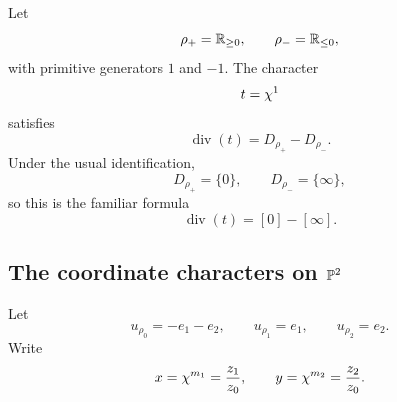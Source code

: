 \begin{example}
Let
\[
\rho_+=\mathbb{R}_{\geq0},
\qquad
\rho_-=\mathbb{R}_{\leq0},
\]
with primitive generators \(1\) and \(-1\). The character
\[
t=\chi^{1}
\]
satisfies
\[
\operatorname{div}(t)
=
D_{\rho_+}-D_{\rho_-}.
\]
Under the usual identification,
\[
D_{\rho_+}=\{0\},
\qquad
D_{\rho_-}=\{\infty\},
\]
so this is the familiar formula
\[
\operatorname{div}(t)
=
[0]-[\infty].
\]
\end{example}

\subsection{The coordinate characters on \texorpdfstring{\(\mathbb{P}^2\)}{P2}}

Let
\[
u_{\rho_0}=-e_1-e_2,
\qquad
u_{\rho_1}=e_1,
\qquad
u_{\rho_2}=e_2.
\]
Write
\[
x=\chi^{m_1}=\frac{z_1}{z_0},
\qquad
y=\chi^{m_2}=\frac{z_2}{z_0}.
\]

